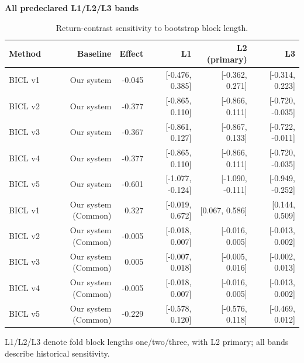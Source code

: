 \begin{table}[htb]
\centering\small
\setlength{\tabcolsep}{3pt}
\renewcommand{\arraystretch}{1.12}
\caption{Return-contrast sensitivity to bootstrap block length.}
\label{tab:u09-sensitivity-return}
\textbf{All predeclared L1/L2/L3 bands}\par\smallskip
\begin{tabular}{lrrrrr}
\hline
Method & Baseline & Effect & L1 & L2 (primary) & L3 \\
\hline
BICL v1 & Our system & -0.045 & [-0.476, 0.385] & [-0.362, 0.271] & [-0.314, 0.223] \\
BICL v2 & Our system & -0.377 & [-0.865, 0.110] & [-0.866, 0.111] & [-0.720, -0.035] \\
BICL v3 & Our system & -0.367 & [-0.861, 0.127] & [-0.867, 0.133] & [-0.722, -0.011] \\
BICL v4 & Our system & -0.377 & [-0.865, 0.110] & [-0.866, 0.111] & [-0.720, -0.035] \\
BICL v5 & Our system & -0.601 & [-1.077, -0.124] & [-1.090, -0.111] & [-0.949, -0.252] \\
BICL v1 & Our system (Common) & 0.327 & [-0.019, 0.672] & [0.067, 0.586] & [0.144, 0.509] \\
BICL v2 & Our system (Common) & -0.005 & [-0.018, 0.007] & [-0.016, 0.005] & [-0.013, 0.002] \\
BICL v3 & Our system (Common) & 0.005 & [-0.007, 0.018] & [-0.005, 0.016] & [-0.002, 0.013] \\
BICL v4 & Our system (Common) & -0.005 & [-0.018, 0.007] & [-0.016, 0.005] & [-0.013, 0.002] \\
BICL v5 & Our system (Common) & -0.229 & [-0.578, 0.120] & [-0.576, 0.118] & [-0.469, 0.012] \\
\hline
\end{tabular}\par\medskip
\begin{minipage}{\textwidth}\footnotesize L1/L2/L3 denote fold block lengths one/two/three, with L2 primary; all bands describe historical sensitivity.\end{minipage}
\end{table}
